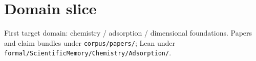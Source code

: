 \section{Domain slice}

First target domain: chemistry / adsorption / dimensional foundations.
Papers and claim bundles under \texttt{corpus/papers/}; Lean under \texttt{formal/ScientificMemory/Chemistry/Adsorption/}.

